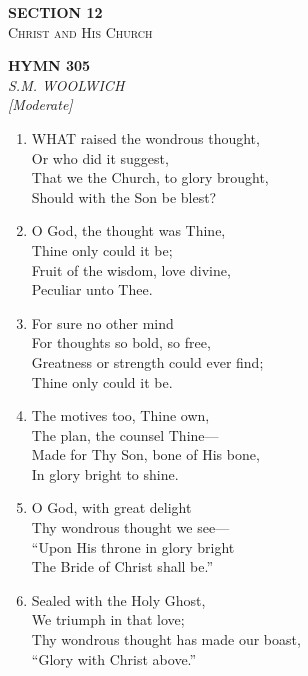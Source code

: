 \newpage
\thispagestyle{empty}
\vspace*{3.5cm}
\begin{center}
    {\LARGE \textbf{SECTION 12}}\\[0.8em]
    {\Large \textsc{Christ and His Church}}
\end{center}
\vspace{3.5cm}

\newpage
\begin{center}
    {\Large \textbf{HYMN 305}}
    \\
    \textit{S.M. WOOLWICH}
    \\
    \textit{\small [Moderate]}
\end{center}
\vspace{1em}

\begin{enumerate}
    \item WHAT raised the wondrous thought, \\
        Or who did it suggest, \\
        That we the Church, to glory brought, \\
        Should with the Son be blest?

    \item O God, the thought was Thine, \\
        Thine only could it be; \\
        Fruit of the wisdom, love divine, \\
        Peculiar unto Thee.

    \item For sure no other mind \\
        For thoughts so bold, so free, \\
        Greatness or strength could ever find; \\
        Thine only could it be.

    \item The motives too, Thine own, \\
        The plan, the counsel Thine--- \\
        Made for Thy Son, bone of His bone, \\
        In glory bright to shine.

    \item O God, with great delight \\
        Thy wondrous thought we see--- \\
        ``Upon His throne in glory bright \\
        The Bride of Christ shall be.''

    \item Sealed with the Holy Ghost, \\
        We triumph in that love; \\
        Thy wondrous thought has made our boast, \\
        ``Glory with Christ above.''

\end{enumerate}

